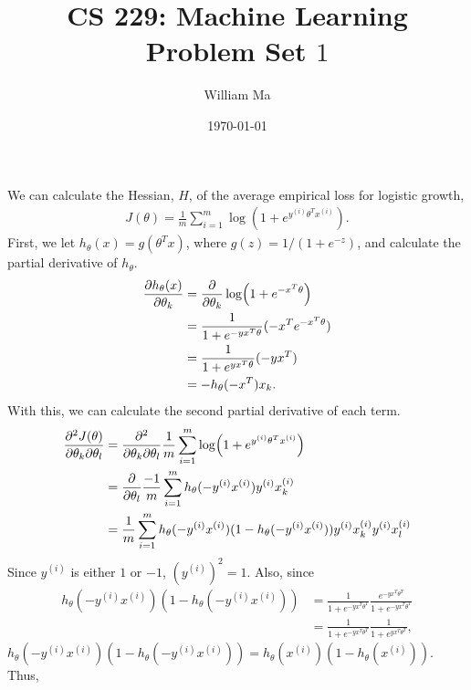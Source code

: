 \documentclass[11pt,a4paper,titlepage]{article}
\title{CS 229: Machine Learning\\
Problem Set $1$}
\author{William Ma}
\date{\today}
\begin{document}
\maketitle

\section{}{
\subsection{}{
\quad We can calculate the Hessian, $H$, of the average empirical loss for logistic growth, 
\begin{align*}
	J(\theta)=\frac{1}{m}\sum_{i=1}^{m}\log(1+e^{y^{(i)}\theta^Tx^{(i)}}).
\end{align*}
First, we let $h_\theta(x) = g(\theta^Tx)$, where $g(z)=1/(1+e^{-z})$, and calculate the partial derivative of $h_\theta$.
\begin{align*}
	\pdv{h_\theta(x)}{\theta_k} &= \pdv{}{\theta_k} \log(1+e^{-x^T\theta})
	\\&= \frac{1}{1+e^{-yx^T\theta}} ({-x}^Te^{-x^T\theta})
    \\&= \frac{1}{1+e^{yx^T\theta}} ({-y}x^T)
    \\&= {-h}_\theta({-x}^T)x_k.
\end{align*}
With this, we can calculate the second partial derivative of each term.
\begin{align*}
	\pdv{J(\theta)}{\theta_k}{\theta_l} &= \pdv{}{\theta_k}{\theta_l} \frac{1}{m}\sum_{i=1}^{m}\log(1+e^{y^{(i)}\theta^Tx^{(i)}})
    \\&= \pdv{}{\theta_l} \frac{-1}{m}\sum_{i=1}^{m} {h}_\theta({-y}^{(i)}x^{(i)}){y}^{(i)}x^{(i)}_k
    \\&= \frac{1}{m}\sum_{i=1}^{m} {h}_\theta({-y}^{(i)}x^{(i)}) (1-{h}_\theta({-y}^{(i)}x^{(i)})) {y}^{(i)}x^{(i)}_k {y}^{(i)}x^{(i)}_l
\end{align*}
Since $y^{(i)}$ is either $1$ or ${-1}$, $(y^{(i)})^2 = 1$. Also, since
\begin{align*}
	{h}_\theta({-y}^{(i)}x^{(i)}) (1-{h}_\theta({-y}^{(i)}x^{(i)})) &= \frac{1}{1+e^{-yx^T\theta^T}} \frac{e^{-yx^T\theta^T}}{1+e^{-yx^T\theta^T}}
    \\&= \frac{1}{1+e^{-yx^T\theta^T}} \frac{1}{1+e^{yx^T\theta^T}},
\end{align*}
${h}_\theta({-y}^{(i)}x^{(i)}) (1-{h}_\theta({-y}^{(i)}x^{(i)})) = {h}_\theta(x^{(i)}) (1-{h}_\theta(x^{(i)}))$. Thus,
\begin{align*}

\end{align*}}}
\end{document}
